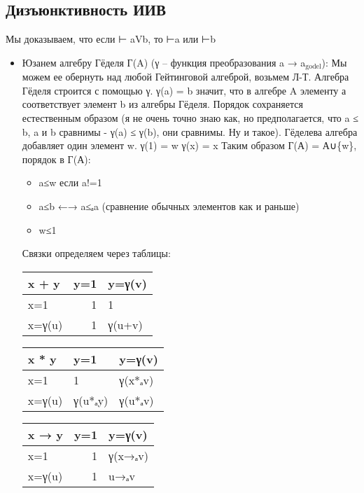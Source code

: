 \documentclass[11pt]{article}
\begin{document}
\subsection{Дизъюнктивность ИИВ}
\label{sec-5-8}
Мы доказываем, что если ⊢ aVb, то ⊢a или ⊢b
\begin{itemize}
\item Юзанем алгебру Гёделя Г(A) (γ – функция преобразования a → a$_{\text{godel}}$):
Мы можем ее обернуть над любой Гейтинговой алгеброй, возьмем Л-Т.
Алгебра Гёделя строится с помощью γ. γ(a) = b значит, что
в алгебре A элементу а соответствует элемент b из алгебры Гёделя.
Порядок сохраняется естественным образом (я не очень точно знаю
как, но предполагается, что a ≤ b, a и b сравнимы - γ(a) ≤ γ(b),
они сравнимы. Ну и такое). Гёделева алгебра добавляет один элемент w.
γ(1) = w
γ(x) = x
Таким образом Г(А) = А∪\{w\}, порядок в Г(А):
\begin{itemize}
\item a≤w если a!=1
\item a≤b ←→ a≤ₐa (сравнение обычных элементов как и раньше)
\item w≤1
\end{itemize}
Связки определяем через таблицы:

\begin{center}
\begin{tabular}{lrl}
\hline
x + y & y=1 & y=γ(v)\\
\hline
x=1 & 1 & 1\\
x=γ(u) & 1 & γ(u+v)\\
\hline
\end{tabular}
\end{center}

\begin{center}
\begin{tabular}{lll}
\hline
x * y & y=1 & y=γ(v)\\
\hline
x=1 & 1 & γ(x*ₐv)\\
x=γ(u) & γ(u*ₐy) & γ(u*ₐv)\\
\hline
\end{tabular}
\end{center}

\begin{center}
\begin{tabular}{lrl}
\hline
x → y & y=1 & y=γ(v)\\
\hline
x=1 & 1 & γ(x→ₐv)\\
x=γ(u) & 1 & u→ₐv\\
\hline
\end{tabular}
\end{center}


\end{itemize}
\end{document}
